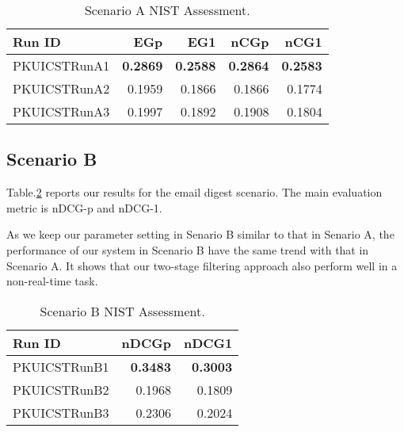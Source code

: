 \begin{table}[htbp]
\centering
\caption{Scenario A NIST Assessment.}
\label{tab:A_NIST}
\begin{tabular}{lrrrr}
\hline
Run ID&EGp&EG1&nCGp&nCG1\\
\hline
PKUICSTRunA1&\textbf{0.2869}&\textbf{0.2588}&\textbf{0.2864}&\textbf{0.2583}\\
PKUICSTRunA2&0.1959&0.1866&0.1866&0.1774\\
PKUICSTRunA3&0.1997&0.1892&0.1908&0.1804\\
\hline
\end{tabular}
\end{table}

\subsection{Scenario B}

Table.\ref{tab:B_NIST} reports our results for the email digest scenario.
The main evaluation metric is nDCG-p and nDCG-1.

As we keep our parameter setting in Senario B similar to that in Senario A,
the performance of our system in Scenario B have the same trend with that in Scenario A. 
It shows that our two-stage filtering approach also perform well in a non-real-time task.

\begin{table}[htbp]
\centering
\caption{Scenario B NIST Assessment.}
\label{tab:B_NIST}
\begin{tabular}{lrr}
\hline
Run ID&nDCGp&nDCG1\\
\hline
PKUICSTRunB1&\textbf{0.3483}&\textbf{0.3003}\\
PKUICSTRunB2&0.1968&0.1809\\
PKUICSTRunB3&0.2306&0.2024\\
\hline
\end{tabular}
\end{table}


